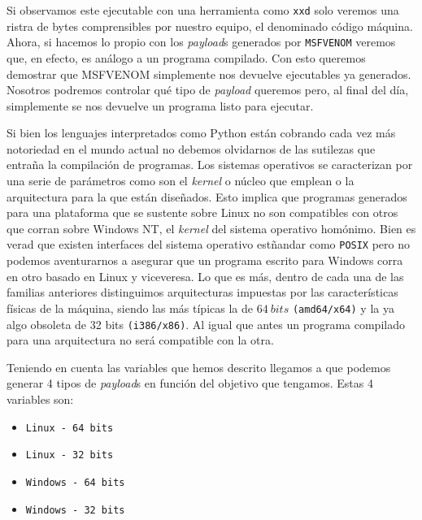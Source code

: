 \documentclass[12pt]{article}
\newcommand{\newpar} {
    \vskip 1cm
}
\begin{document}
                \newpar

                Si observamos este ejecutable con una herramienta como \texttt{xxd} solo veremos una ristra de bytes comprensibles por nuestro equipo, el denominado código máquina. Ahora, si hacemos lo propio con los \textit{payload}s generados por \texttt{MSFVENOM} veremos que, en efecto, es análogo a un programa compilado. Con esto queremos demostrar que MSFVENOM simplemente nos devuelve ejecutables ya generados. Nosotros podremos controlar qué tipo de \textit{payload} queremos pero, al final del día, simplemente se nos devuelve un programa listo para ejecutar.

                \newpar

                Si bien los lenguajes interpretados como Python están cobrando cada vez más notoriedad en el mundo actual no debemos olvidarnos de las sutilezas que entraña la compilación de programas. Los sistemas operativos se caracterizan por una serie de parámetros como son el \textit{kernel} o núcleo que emplean o la arquitectura para la que están diseñados. Esto implica que programas generados para una plataforma que se sustente sobre Linux no son compatibles con otros que corran sobre Windows NT, el \textit{kernel} del sistema operativo homónimo. Bien es verad que existen interfaces del sistema operativo estñandar como \texttt{POSIX} pero no podemos aventurarnos a asegurar que un programa escrito para Windows corra en otro basado en Linux y viceveresa. Lo que es más, dentro de cada una de las familias anteriores distinguimos arquitecturas impuestas por las características físicas de la máquina, siendo las más típicas la de $64\ bits$ \texttt{(amd64/x64)} y la ya algo obsoleta de 32 bits \texttt{(i386/x86)}. Al igual que antes un programa compilado para una arquitectura no será compatible con la otra.

                \newpar

                Teniendo en cuenta las variables que hemos descrito llegamos a que podemos generar 4 tipos de \textit{payload}s en función del objetivo que tengamos. Estas 4 variables son:

                \begin{itemize}
                    \item \texttt{Linux - 64 bits}
                    \item \texttt{Linux - 32 bits}
                    \item \texttt{Windows - 64 bits}
                    \item \texttt{Windows - 32 bits}
                \end{itemize}
\end{document}
